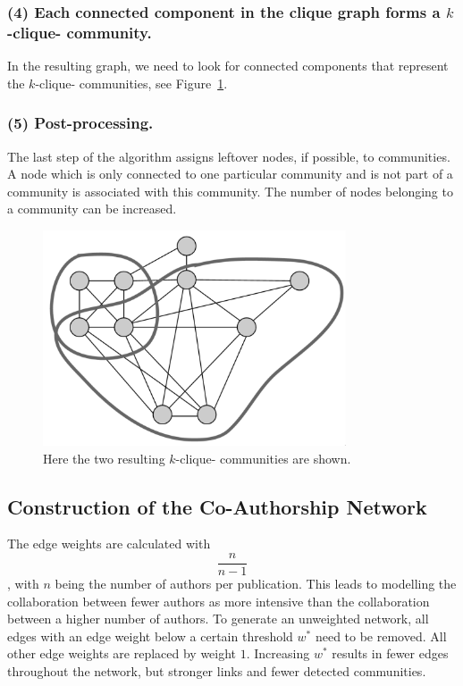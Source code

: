 \documentclass[runningheads,a4paper]{llncs}
\begin{document}
\subsubsection{(4) Each connected component in the clique graph forms a $k$-clique- community.}
In the resulting graph, we need to look for connected components that represent the $k$-clique- communities, see Figure~\ref{fig:final}.

\subsubsection{(5) Post-processing.}
The last step of the algorithm assigns leftover nodes, if possible, to communities. A node which is only connected to one particular community and is not part of a community is associated with this community. The number of nodes belonging to a community can be increased.

\begin{figure}
\begin{center}
	\includegraphics[width=0.8\textwidth]{img/final}
		\caption{Here the two resulting $k$-clique- communities are shown.}
		\label{fig:final}
\end{center}
\end{figure}


\subsection{Construction of the Co-Authorship Network}
\label{cpm-construction}
The edge weights are calculated with $$\frac{n}{n-1}$$, with $n$ being the number of authors per publication.
This leads to modelling the collaboration between fewer authors as more intensive than the collaboration between a higher number of authors.  
To generate an unweighted network, all edges with an edge weight below a certain threshold $w^*$ need to be removed. All other edge weights are replaced by weight $1$. Increasing $w^*$ results in fewer edges throughout the network, but stronger links and fewer detected communities.
\end{document}
